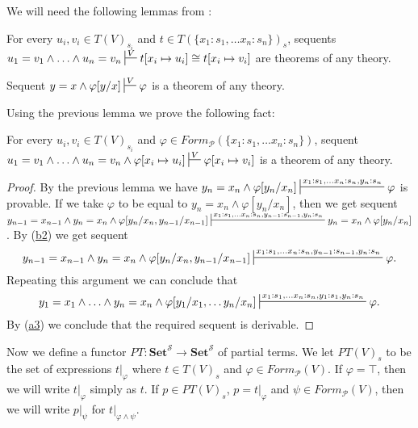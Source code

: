 \documentclass{elsarticle}
\newcommand{\axref}[1]{(\hyperref[ax:#1]{#1})}
\theoremstyle{definition}
\theoremstyle{remark}
\newcommand{\cat}[1]{\mathbf{#1}}
\newcommand{\Set}{\cat{Set}}
\numberwithin{figure}{section}
\begin{document}
We will need the following lemmas from \cite{PHL}:
\begin{lem}[cong-a]
For every $u_i,v_i \in T(V)_{s_i}$ and $t \in T(\{ x_1 : s_1, \ldots x_n : s_n\})_s$,
sequents $u_1 = v_1 \land \ldots \land u_n = v_n \sststile{}{V} t[x_i \mapsto u_i] \cong t[x_i \mapsto v_i]$ are theorems of any theory.
\end{lem}

\begin{lem}
Sequent $y = x \land \varphi[y/x] \sststile{}{V} \varphi$ is a theorem of any theory.
\end{lem}

Using the previous lemma we prove the following fact:

\begin{lem}[cong-b]
For every $u_i,v_i \in T(V)_{s_i}$ and $\varphi \in Form_\mathcal{P}(\{ x_1 : s_1, \ldots x_n : s_n\})$,
sequent $u_1 = v_1 \land \ldots \land u_n = v_n \land \varphi[x_i \mapsto u_i] \sststile{}{V} \varphi[x_i \mapsto v_i]$ is a theorem of any theory.
\end{lem}
\begin{proof}
By the previous lemma we have $y_n = x_n \land \varphi[y_n/x_n] \sststile{}{x_1 : s_1, \ldots x_n : s_n, y_n : s_n} \varphi$ is provable.
If we take $\varphi$ to be equal to $y_n = x_n \land \varphi[y_n/x_n]$, then we get sequent
$y_{n-1} = x_{n-1} \land y_n = x_n \land \varphi[y_n/x_n,y_{n-1}/x_{n-1}] \sststile{}{x_1 : s_1, \ldots x_n : s_n, y_{n-1} : s_{n-1}, y_n : s_n} y_n = x_n \land \varphi[y_n/x_n]$.
By \axref{b2} we get sequent
\[ y_{n-1} = x_{n-1} \land y_n = x_n \land \varphi[y_n/x_n,y_{n-1}/x_{n-1}] \sststile{}{x_1 : s_1, \ldots x_n : s_n, y_{n-1} : s_{n-1}, y_n : s_n} \varphi. \]
Repeating this argument we can conclude that
\[ y_1 = x_1 \land \ldots \land y_n = x_n \land \varphi[y_1/x_1, \ldots y_n/x_n] \sststile{}{x_1 : s_1, \ldots x_n : s_n, y_1 : s_1, y_n : s_n} \varphi. \]
By \axref{a3} we conclude that the required sequent is derivable.
\end{proof}

Now we define a functor $PT : \Set^\mathcal{S} \to \Set^\mathcal{S}$ of partial terms.
We let $PT(V)_s$ to be the set of expressions $t|_\varphi$ where $t \in T(V)_s$ and $\varphi \in Form_\mathcal{P}(V)$.
If $\varphi = \top$, then we will write $t|_\varphi$ simply as $t$.
If $p \in PT(V)_s$, $p = t|_\varphi$ and $\psi \in Form_\mathcal{P}(V)$, then we will write $p|_\psi$ for $t|_{\varphi \land \psi}$.
\end{document}
